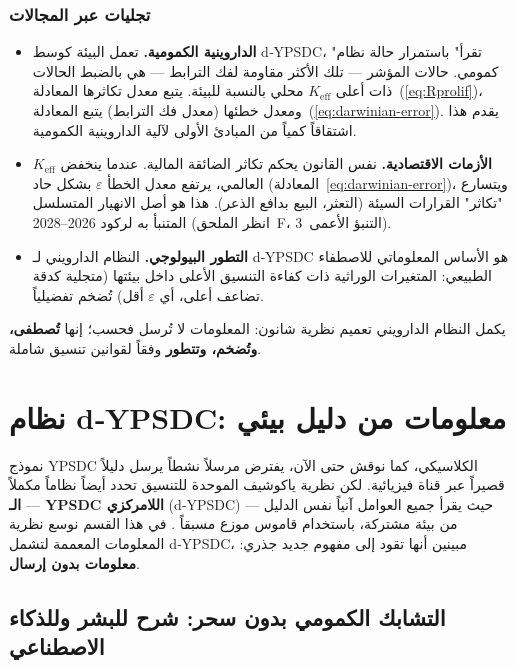 \documentclass[12pt,a4paper]{article}
\theoremstyle{remark}
\begin{document}
	\subsubsection*{تجليات عبر المجالات}
	\begin{itemize}[leftmargin=*]
		\item \textbf{الداروينية الكمومية.} تعمل البيئة كوسط d‑YPSDC، "تقرأ" باستمرار حالة نظام كمومي. حالات المؤشر — تلك الأكثر مقاومة لفك الترابط — هي بالضبط الحالات ذات أعلى \(K_{\mathrm{eff}}\) محلي بالنسبة للبيئة. يتبع معدل تكاثرها المعادلة~(\ref{eq:Rprolif})، ومعدل خطئها (معدل فك الترابط) يتبع المعادلة~(\ref{eq:darwinian-error}). يقدم هذا اشتقاقاً كمياً من المبادئ الأولى لآلية الداروينية الكمومية.
		\item \textbf{الأزمات الاقتصادية.} نفس القانون يحكم تكاثر الضائقة المالية. عندما ينخفض \(K_{\mathrm{eff}}\) العالمي، يرتفع معدل الخطأ \(\varepsilon\) بشكل حاد (المعادلة~\ref{eq:darwinian-error})، ويتسارع "تكاثر" القرارات السيئة (التعثر، البيع بدافع الذعر). هذا هو أصل الانهيار المتسلسل المتنبأ به لركود 2026--2028 (انظر الملحق~F، التنبؤ الأعمى~3).
		\item \textbf{التطور البيولوجي.} النظام الدارويني لـ d‑YPSDC هو الأساس المعلوماتي للاصطفاء الطبيعي: المتغيرات الوراثية ذات كفاءة التنسيق الأعلى داخل بيئتها (متجلية كدقة تضاعف أعلى، أي \(\varepsilon\) أقل) تُضخم تفضيلياً.
	\end{itemize}
	
	يكمل النظام الدارويني تعميم نظرية شانون: المعلومات لا تُرسل فحسب؛ إنها \textbf{تُصطفى، وتُضخم، وتتطور} وفقاً لقوانين تنسيق شاملة.
	
	\section{نظام d‑YPSDC: معلومات من دليل بيئي}
	\label{sec:d-ypsdc-info}
	
	نموذج YPSDC الكلاسيكي، كما نوقش حتى الآن، يفترض مرسلاً نشطاً يرسل دليلاً قصيراً عبر قناة فيزيائية. لكن نظرية ياكوشيف الموحدة للتنسيق تحدد أيضاً نظاماً مكملاً --- \textbf{الـ YPSDC اللامركزي} (d‑YPSDC) --- حيث يقرأ جميع العوامل آنياً نفس الدليل من بيئة مشتركة، باستخدام قاموس موزع مسبقاً \cite{Appendix_dYPSDC}. في هذا القسم نوسع نظرية المعلومات المعممة لتشمل d‑YPSDC، مبينين أنها تقود إلى مفهوم جديد جذري: \textbf{معلومات بدون إرسال}.
	
	\subsection{التشابك الكمومي بدون سحر: شرح للبشر وللذكاء الاصطناعي}
	
\end{document}
